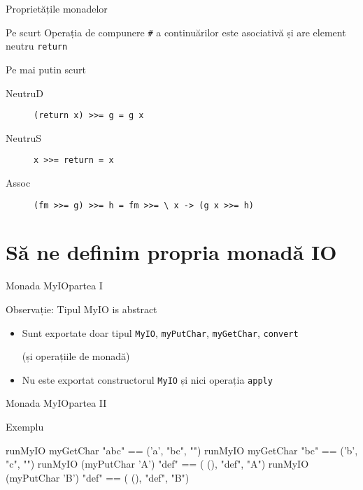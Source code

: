 \documentclass[xcolor=pdftex,romanian,colorlinks]{beamer}
\begin{document}
\begin{frame}[fragile]{Proprietățile monadelor}
\begin{block}{Pe scurt}
Operația de compunere \lstinline$#$ a continuărilor este asociativă și are element neutru \lstinline$return$
\end{block}

\begin{block}{Pe mai putin scurt}
\begin{description}
\item[NeutruD] \lstinline$(return x) >>= g = g x$
\item[NeutruS] \lstinline$x >>= return = x$
\item[Assoc] \lstinline$(fm >>= g) >>= h = fm >>= \ x -> (g x >>= h)$
\end{description}
\end{block}

\end{frame}






%

\section{Să ne definim propria monadă IO}


\begin{frame}[fragile]{Monada MyIO}{partea I}


\begin{block}{Observație: Tipul MyIO is abstract}
\begin{itemize} 
\item Sunt exportate doar tipul \lstinline$MyIO$, \lstinline$myPutChar$, \lstinline$myGetChar$, \lstinline$convert$ 

(și operațiile de monadă)
\item Nu este exportat constructorul \lstinline$MyIO$ și nici operația \lstinline$apply$
\end{itemize}
\end{block} 
\end{frame}

%


\begin{frame}[fragile]{Monada MyIO}{partea II}


\begin{block}
{Exemplu}
\begin{asciihs}
   runMyIO myGetChar        "abc" == ('a',  "bc",  "")
   runMyIO myGetChar        "bc"  == ('b',   "c",  "")
   runMyIO (myPutChar 'A')  "def" == ( (), "def", "A")
   runMyIO (myPutChar 'B')  "def" == ( (), "def", "B")
\end{asciihs}
\end{block}

\end{frame}
\end{document}
